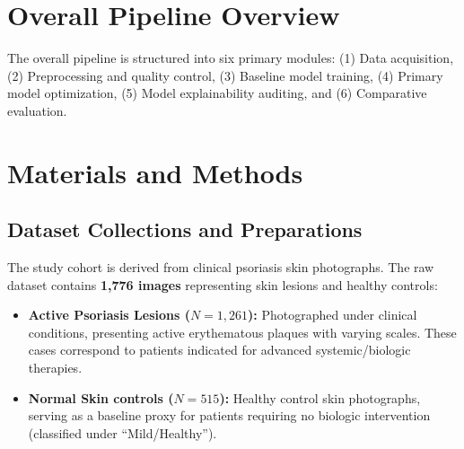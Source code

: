\documentclass[11pt,journal,compsoc]{IEEEtran}
\begin{document}
\section{Overall Pipeline Overview}
The overall pipeline is structured into six primary modules: (1) Data acquisition, (2) Preprocessing and quality control, (3) Baseline model training, (4) Primary model optimization, (5) Model explainability auditing, and (6) Comparative evaluation.

\section{Materials and Methods}

\subsection{Dataset Collections and Preparations}
The study cohort is derived from clinical psoriasis skin photographs. The raw dataset contains \textbf{1,776 images} representing skin lesions and healthy controls:
\begin{itemize}
    \item \textbf{Active Psoriasis Lesions ($N=1,261$):} Photographed under clinical conditions, presenting active erythematous plaques with varying scales. These cases correspond to patients indicated for advanced systemic/biologic therapies.
    \item \textbf{Normal Skin controls ($N=515$):} Healthy control skin photographs, serving as a baseline proxy for patients requiring no biologic intervention (classified under ``Mild/Healthy'').
\end{itemize}
\end{document}
